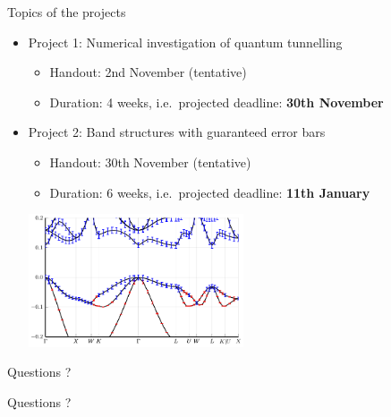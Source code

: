 \begin{frame}{Topics of the projects}
    \begin{itemize}
        \item Project 1: \alert{Numerical investigation of quantum tunnelling}
            \begin{itemize}
                \vspace{-0.5em}
                \item Handout: 2nd November \textcolor{grey5}{(tentative)}
                \vspace{-0.5em}
                \item Duration: 4 weeks, i.e.~projected deadline: \textbf{30th November}
            \end{itemize}
        \vspace{1.0em}
        \item Project 2: \alert{Band structures with guaranteed error bars}
            \begin{itemize}
                \vspace{-0.5em}
                \item Handout: 30th November \textcolor{grey5}{(tentative)}
                \vspace{-0.5em}
                \item Duration: 6 weeks, i.e.~projected deadline: \textbf{11th January}
            \end{itemize}
        \vspace{0.5em}
        \begin{center}
        \includegraphics[width=0.5\textwidth]{img/si_band_errors.pdf}
        \end{center}
    \end{itemize}
\end{frame}

\begin{frame}{Questions ?}
    \begin{center}
        \huge{Questions ?}
    \end{center}
\end{frame}
